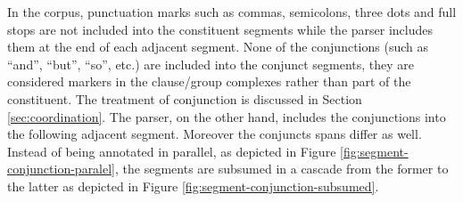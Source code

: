 
In the corpus, punctuation marks such as commas, semicolons, three dots and full stops are not included into the constituent segments while the parser includes them at the end of each adjacent segment. None of the conjunctions (such as ``and'', ``but'', ``so'', etc.) are included into the conjunct segments, they are considered markers in the clause/group complexes rather than part of the constituent. The treatment of conjunction is discussed in Section \ref{sec:coordination}. The parser, on the other hand, includes the conjunctions into the following adjacent segment. Moreover the conjuncts spans differ as well. Instead of being annotated in parallel, as depicted in Figure \ref{fig:segment-conjunction-paralel}, the segments are subsumed in a cascade from the former to the latter as depicted in Figure \ref{fig:segment-conjunction-subsumed}. 

